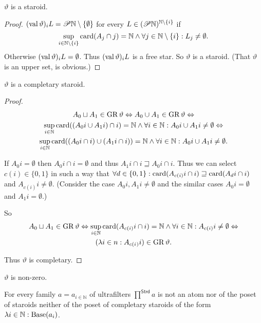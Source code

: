 \begin{prop}
$\vartheta$ is a staroid.\end{prop}
\begin{proof}
$(\operatorname{val}\vartheta)_{i}L=\mathscr{P}\mathbb{N}\setminus\{\emptyset\}$ for
every $L\in(\mathscr{P}\mathbb{N})^{\mathbb{N}\setminus\{i\}}$ if 
\[
\sup_{i\in\mathbb{N}\setminus\{i\}}\operatorname{card}(A_{j}\cap j)=\mathbb{N}\wedge\forall j\in\mathbb{N}\setminus\{i\}:L_{j}\neq\emptyset.
\]
Otherwise $(\operatorname{val}\vartheta)_{i}L=\emptyset$. Thus $(\operatorname{val}\vartheta)_{i}L$
is a free star. So $\vartheta$ is a staroid. (That $\vartheta$ is
an upper set, is obvious.)\end{proof}
\begin{prop}
$\vartheta$ is a completary staroid.\end{prop}
\begin{proof}
~
\begin{multline*}
A_{0}\sqcup A_{1}\in\operatorname{GR}\vartheta\Leftrightarrow A_{0}\cup A_{1}\in\operatorname{GR}\vartheta\Leftrightarrow\\
\sup_{i\in\mathbb{N}}\operatorname{card}((A_{0}i\cup A_{1}i)\cap i)=\mathbb{N}\wedge\forall i\in\mathbb{N}:A_{0}i\cup A_{1}i\neq\emptyset\Leftrightarrow\\
\sup_{i\in\mathbb{N}}\operatorname{card}((A_{0}i\cap i)\cup(A_{1}i\cap i))=\mathbb{N}\wedge\forall i\in\mathbb{N}:A_{0}i\cup A_{1}i\neq\emptyset.
\end{multline*}


If $A_{0}i=\emptyset$ then $A_{0}i\cap i=\emptyset$ and thus $A_{1}i\cap i\sqsupseteq A_{0}i\cap i$.
Thus we can select $c(i)\in\{0,1\}$ in such a way that $\forall d\in\{0,1\}:\operatorname{card}(A_{c(i)}i\cap i)\sqsupseteq\operatorname{card}(A_{d}i\cap i)$
and $A_{c(i)}i\neq\emptyset$. (Consider the case $A_{0}i,A_{1}i\neq\emptyset$
and the similar cases $A_{0}i=\emptyset$ and $A_{1}i=\emptyset$.)

So 
\begin{multline*}
A_{0}\sqcup A_{1}\in\operatorname{GR}\vartheta\Leftrightarrow\sup_{i\in\mathbb{N}}\operatorname{card}(A_{c(i)}i\cap i)=\mathbb{N}\wedge\forall i\in\mathbb{N}:A_{c(i)}i\neq\emptyset\Leftrightarrow\\
(\lambda i\in n:A_{c(i_{})}i)\in\operatorname{GR}\vartheta.
\end{multline*}


Thus $\vartheta$ is completary.\end{proof}
\begin{obvious}
$\vartheta$ is non-zero.\end{obvious}
\begin{example}
For every family $a=a_{i\in\mathbb{N}}$ of ultrafilters $\prod^{\mathsf{Strd}}a$
is not an atom nor of the poset of staroids neither of the poset of
completary staroids of the form $\lambda i\in\mathbb{N}:\operatorname{Base}(a_{i})$.\end{example}
